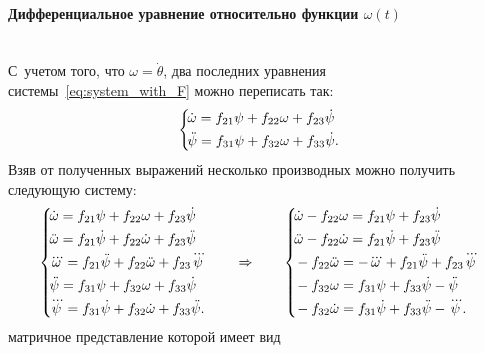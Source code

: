 \documentclass[12pt,a4paper,openany]{extarticle}
\begin{document}
\paragraph*{Дифференциальное уравнение относительно функции $\omega(t)$}$\phantom{-}$\\
\hspace*{\parindent}С~учетом того, что $\omega = \dot\theta$, два последних уравнения системы~\eqref{eq:system_with_F} можно переписать так:
\begin{equation}\label{eq:two_eqs_with_omega_not_theta}
	\left\{
	\begin{aligned}
		\!&\dot\omega = f_{21}\psi + f_{22}\omega + f_{23}\dot\psi\\
		\!&\ddot\psi = f_{31}\psi + f_{32}\omega + f_{33}\dot\psi\ldotp
	\end{aligned}
	\right.
\end{equation}
Взяв от полученных выражений несколько производных можно получить следующую систему:
\begin{equation}
\left\{
	\begin{aligned}
		\!&\dot\omega = f_{21}\psi + f_{22}\omega + f_{23}\dot\psi\\
		\!&\ddot\omega = f_{21}\dot\psi + f_{22}\dot\omega + f_{23}\ddot\psi\\
		\!&\dddot\omega = f_{21}\ddot\psi + f_{22}\ddot\omega + f_{23}\dddot\psi\\		
		\!&\ddot\psi = f_{31}\psi + f_{32}\omega + f_{33}\dot\psi\\
		\!&\dddot\psi = f_{31}\dot\psi + f_{32}\dot\omega + f_{33}\ddot\psi\ldotp
	\end{aligned}
\right.\qquad\Rightarrow\qquad
\left\{
	\begin{aligned}
		\!&\dot\omega - f_{22}\omega = f_{21}\psi + f_{23}\dot\psi\\
		\!&\ddot\omega - f_{22}\dot\omega = f_{21}\dot\psi + f_{23}\ddot\psi\\
		\!&- f_{22}\ddot\omega = -\dddot\omega + f_{21}\ddot\psi + f_{23}\dddot\psi\\		
		\!&- f_{32}\omega = f_{31}\psi + f_{33}\dot\psi - \ddot\psi\\
		\!&- f_{32}\dot\omega = f_{31}\dot\psi + f_{33}\ddot\psi - \dddot\psi\ldotp
	\end{aligned}
\right.
\end{equation}
матричное представление которой имеет вид
\end{document}
